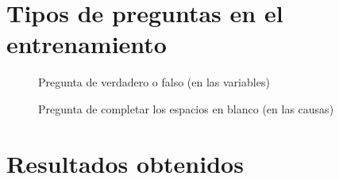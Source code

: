 {\section{Tipos de preguntas en el entrenamiento}

\begin{figure}[H]
\centering
 \caption{Pregunta de verdadero o falso (en las variables)}
 \label{fig:pregvar} 
\end{figure}

\begin{figure}[H]
\centering
 \caption{Pregunta de completar los espacios en blanco (en las causas)}
 \label{fig:pregcaus} 
\end{figure}


\section{Resultados obtenidos}

}
